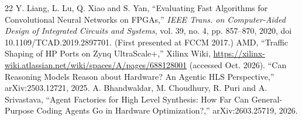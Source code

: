 \begin{thebibliography}{22}
 Y. Liang, L. Lu, Q. Xiao and S. Yan, ``Evaluating Fast Algorithms for Convolutional Neural Networks on FPGAs,'' \emph{IEEE Trans. on Computer-Aided Design of Integrated Circuits and Systems}, vol. 39, no. 4, pp. 857--870, 2020, doi 10.1109/TCAD.2019.2897701. (First presented at FCCM 2017.)
 AMD, ``Traffic Shaping of HP Ports on Zynq UltraScale+,'' Xilinx Wiki, \url{https://xilinx-wiki.atlassian.net/wiki/spaces/A/pages/688128001} (accessed Oct. 2026).
 ``Can Reasoning Models Reason about Hardware? An Agentic HLS Perspective,'' arXiv:2503.12721, 2025.
 A. Bhandwaldar, M. Choudhury, R. Puri and A. Srivastava, ``Agent Factories for High Level Synthesis: How Far Can General-Purpose Coding Agents Go in Hardware Optimization?,'' arXiv:2603.25719, 2026.
\end{thebibliography}
